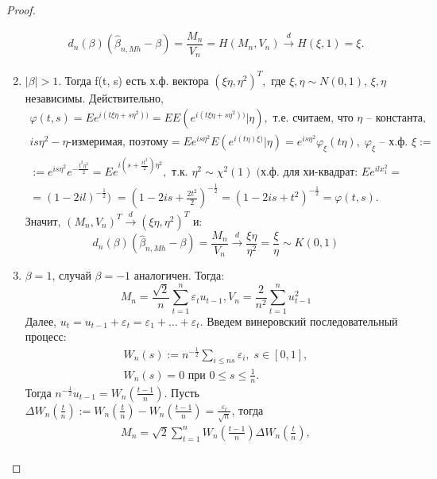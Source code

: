 \begin{proof}
\begin{enumerate}
        $$\begin{gathered}
            d_n(\beta)(\hat{\beta}_{n, Mh} - \beta) = \dfrac{M_n}{V_n} = H(M_n, V_n) \stackrel{d}{\to} H(\xi, 1) = \xi.
        \end{gathered}$$
        \item $ |\beta| > 1$. Тогда f(t, s) есть х.ф. вектора $(\xi\eta, \eta^2)^T,$ где $\xi, \eta \sim N(0, 1)$, $\xi, \eta$ независимы. Действительно, 
        $$\begin{gathered}
            \varphi(t, s) = Ee^{i(t\xi\eta + s\eta^2))} = EE(e^{i(t\xi\eta + s\eta^2))}|\eta), \text{ т.е. считаем, что } \eta \text{ -- константа,}\\
            is\eta^2 - \eta \text{-измеримая, поэтому} = Ee^{is\eta^2}E(e^{i(t\eta)\xi)}|\eta) = e^{is\eta^2} \varphi_{\xi}(t\eta), \; \varphi_{\xi} \text{ -- х.ф. } \xi :=\\
            := e^{is\eta^2} e^{-\frac{t^2\eta^2}{2}} = Ee^{i(s + \frac{it^2}{2})\eta^2}, \text{ т.к. } \eta^2 \sim \chi^2(1) \; (\text{х.ф. для хи-квадрат: } Ee^{ilx^2_1} =\\
            = (1 - 2il)^{-\frac{1}{2}}) \; = (1 - 2is + \frac{2t^2}{2})^{-\frac{1}{2}} =(1 - 2is + t^2)^{-\frac{1}{2}} = \varphi(t, s). 
        \end{gathered}$$
        Значит, $(M_n, V_n)^T \stackrel{d}{\to} (\xi\eta, \eta^2)^T$ и:
        $$d_n(\beta)(\hat{\beta}_{n, Mh} - \beta) = \dfrac{M_n}{V_n} \stackrel{d}{\to} \dfrac{\xi\eta}{\eta^2} = \dfrac{\xi}{\eta} \sim K(0, 1)$$
        \item $ \beta = 1$, случай $ \beta = -1$ аналогичен. Тогда:
        $$M_n = \dfrac{\sqrt{2}}{n} \sum\limits_{t = 1}^n \varepsilon_t u_{t - 1}, V_n = \dfrac{2}{n^2} \sum\limits_{t = 1}^n u_{t - 1}^2$$
        Далее, $u_t = u_{t - 1} + \varepsilon_t = \varepsilon_1 + \ldots + \varepsilon_t.$ Введем винеровский последовательный процесс:
        $$\begin{gathered}
            W_n(s) := n^{-\frac{1}{2}}\sum\limits_{i \leq ns} \varepsilon_i, \; s \in [0, 1], \\
            W_n(s) = 0 \text{ при } 0 \leq s \leq \frac{1}{n}.
        \end{gathered}$$
        Тогда $n^{-\frac{1}{2}} u_{t - 1} = W_n(\frac{t - 1}{n})$. Пусть $\Delta W_n(\frac{t}{n}) := W_n(\frac{t}{n}) - W_n(\frac{t - 1}{n}) = \frac{\varepsilon_t}{\sqrt{n}}$, тогда
        $$\begin{gathered}
            M_n = \sqrt{2} \sum\limits_{t = 1}^n W_n(\frac{t - 1}{n})\Delta W_n(\frac{t}{n}),\\

\end{gathered}$$
\end{enumerate}
\end{proof}
